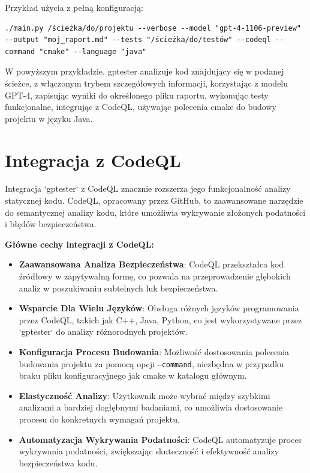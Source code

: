 Przykład użycia z pełną konfiguracją:

\begin{listing}
    \begin{verbatim}
./main.py /ścieżka/do/projektu --verbose --model "gpt-4-1106-preview" --output "moj_raport.md" --tests "/ścieżka/do/testów" --codeql --command "cmake" --language "java"
\end{verbatim}
\end{listing}

W powyższym przykładzie, gptester analizuje kod znajdujący się w podanej ścieżce, z włączonym trybem szczegółowych informacji, korzystając z modelu GPT-4, zapisując wyniki do określonego pliku raportu, wykonując testy funkcjonalne, integrując z CodeQL, używając polecenia cmake do budowy projektu w języku Java.

\section{Integracja z CodeQL}
\label{sec:integracja_codeql}

Integracja `gptester` z CodeQL znacznie rozszerza jego funkcjonalność analizy statycznej kodu. CodeQL, opracowany przez GitHub, to zaawansowane narzędzie do semantycznej analizy kodu, które umożliwia wykrywanie złożonych podatności i błędów bezpieczeństwa.

\textbf{Główne cechy integracji z CodeQL:}
\begin{itemize}
    \item \textbf{Zaawansowana Analiza Bezpieczeństwa}: CodeQL przekształca kod źródłowy w zapytywalną formę, co pozwala na przeprowadzenie głębokich analiz w poszukiwaniu subtelnych luk bezpieczeństwa.
    \item \textbf{Wsparcie Dla Wielu Języków}: Obsługa różnych języków programowania przez CodeQL, takich jak C++, Java, Python, co jest wykorzystywane przez `gptester` do analizy różnorodnych projektów.
    \item \textbf{Konfiguracja Procesu Budowania}: Możliwość dostosowania polecenia budowania projektu za pomocą opcji \texttt{--command}, niezbędna w przypadku braku pliku konfiguracyjnego jak cmake w katalogu głównym.
    \item \textbf{Elastyczność Analizy}: Użytkownik może wybrać między szybkimi analizami a bardziej dogłębnymi badaniami, co umożliwia dostosowanie procesu do konkretnych wymagań projektu.
    \item \textbf{Automatyzacja Wykrywania Podatności}: CodeQL automatyzuje proces wykrywania podatności, zwiększając skuteczność i efektywność analizy bezpieczeństwa kodu.
\end{itemize}

